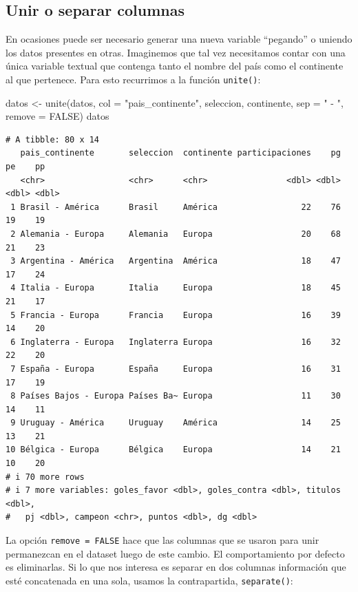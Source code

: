\documentclass[
]{book}
\newenvironment{Shaded}{\begin{snugshade}}{\end{snugshade}}
\newcommand{\AttributeTok}[1]{\textcolor[rgb]{0.77,0.63,0.00}{#1}}
\newcommand{\ConstantTok}[1]{\textcolor[rgb]{0.00,0.00,0.00}{#1}}
\newcommand{\FunctionTok}[1]{\textcolor[rgb]{0.00,0.00,0.00}{#1}}
\newcommand{\NormalTok}[1]{#1}
\newcommand{\OtherTok}[1]{\textcolor[rgb]{0.56,0.35,0.01}{#1}}
\newcommand{\StringTok}[1]{\textcolor[rgb]{0.31,0.60,0.02}{#1}}
\begin{document}
\hypertarget{unir-o-separar-columnas}{%
\subsection{Unir o separar columnas}\label{unir-o-separar-columnas}}

En ocasiones puede ser necesario generar una nueva variable ``pegando'' o uniendo los datos presentes en otras. Imaginemos que tal vez necesitamos contar con una única variable textual que contenga tanto el nombre del país como el continente al que pertenece. Para esto recurrimos a la función \texttt{unite()}:

\begin{Shaded}
\begin{Highlighting}[]
\NormalTok{datos }\OtherTok{\textless{}{-}} \FunctionTok{unite}\NormalTok{(datos, }\AttributeTok{col =} \StringTok{"pais\_continente"}\NormalTok{, seleccion, continente, }\AttributeTok{sep =} \StringTok{" {-} "}\NormalTok{, }\AttributeTok{remove =} \ConstantTok{FALSE}\NormalTok{)}
\NormalTok{datos}
\end{Highlighting}
\end{Shaded}

\begin{verbatim}
# A tibble: 80 x 14
   pais_continente       seleccion  continente participaciones    pg    pe    pp
   <chr>                 <chr>      <chr>                <dbl> <dbl> <dbl> <dbl>
 1 Brasil - América      Brasil     América                 22    76    19    19
 2 Alemania - Europa     Alemania   Europa                  20    68    21    23
 3 Argentina - América   Argentina  América                 18    47    17    24
 4 Italia - Europa       Italia     Europa                  18    45    21    17
 5 Francia - Europa      Francia    Europa                  16    39    14    20
 6 Inglaterra - Europa   Inglaterra Europa                  16    32    22    20
 7 España - Europa       España     Europa                  16    31    17    19
 8 Países Bajos - Europa Países Ba~ Europa                  11    30    14    11
 9 Uruguay - América     Uruguay    América                 14    25    13    21
10 Bélgica - Europa      Bélgica    Europa                  14    21    10    20
# i 70 more rows
# i 7 more variables: goles_favor <dbl>, goles_contra <dbl>, titulos <dbl>,
#   pj <dbl>, campeon <chr>, puntos <dbl>, dg <dbl>
\end{verbatim}

La opción \texttt{remove\ =\ FALSE} hace que las columnas que se usaron para unir permanezcan en el dataset luego de este cambio. El comportamiento por defecto es eliminarlas. Si lo que nos interesa es separar en dos columnas información que esté concatenada en una sola, usamos la contrapartida, \texttt{separate()}:
\end{document}
